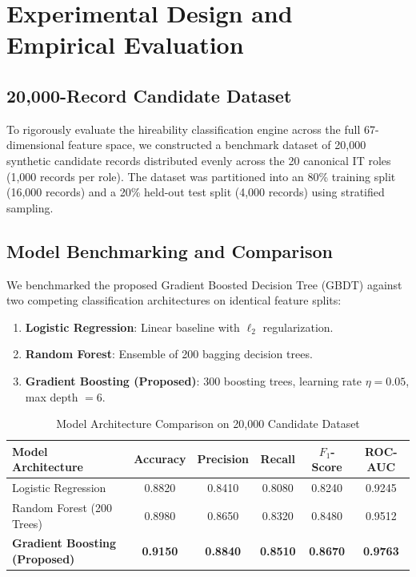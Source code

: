 \documentclass[conference]{IEEEtran}
\begin{document}
\section{Experimental Design and Empirical Evaluation}
\subsection{20,000-Record Candidate Dataset}
To rigorously evaluate the hireability classification engine across the full 67-dimensional feature space, we constructed a benchmark dataset of 20,000 synthetic candidate records distributed evenly across the 20 canonical IT roles (1,000 records per role). The dataset was partitioned into an 80\% training split (16,000 records) and a 20\% held-out test split (4,000 records) using stratified sampling.

\subsection{Model Benchmarking and Comparison}
We benchmarked the proposed Gradient Boosted Decision Tree (GBDT) against two competing classification architectures on identical feature splits:
\begin{enumerate}
    \item \textbf{Logistic Regression}: Linear baseline with $\ell_2$ regularization.
    \item \textbf{Random Forest}: Ensemble of 200 bagging decision trees.
    \item \textbf{Gradient Boosting (Proposed)}: 300 boosting trees, learning rate $\eta = 0.05$, max depth $= 6$.
\end{enumerate}

\begin{table}[h]
\centering
\caption{Model Architecture Comparison on 20,000 Candidate Dataset}
\label{tab:c4_model_comp}
\begin{tabular}{@{}lccccc@{}}
\toprule
\textbf{Model Architecture} & \textbf{Accuracy} & \textbf{Precision} & \textbf{Recall} & \textbf{$F_1$-Score} & \textbf{ROC-AUC} \\
\midrule
Logistic Regression & 0.8820 & 0.8410 & 0.8080 & 0.8240 & 0.9245 \\
Random Forest (200 Trees) & 0.8980 & 0.8650 & 0.8320 & 0.8480 & 0.9512 \\
\textbf{Gradient Boosting (Proposed)} & \textbf{0.9150} & \textbf{0.8840} & \textbf{0.8510} & \textbf{0.8670} & \textbf{0.9763} \\
\bottomrule
\end{tabular}
\end{table}
\end{document}
